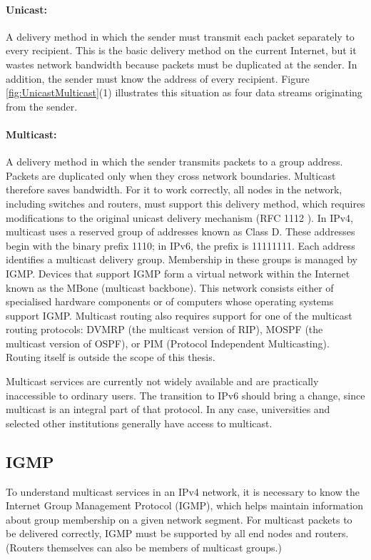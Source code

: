 \paragraph*{Unicast:} A delivery method in which the sender must transmit each packet separately to every recipient. This is the basic delivery method on the current Internet, but it wastes network bandwidth because packets must be duplicated at the sender. In addition, the sender must know the address of every recipient. Figure \ref{fig:UnicastMulticast}(1) illustrates this situation as four data streams originating from the sender.

\paragraph*{Multicast:} A delivery method in which the sender transmits packets to a group address. Packets are duplicated only when they cross network boundaries. Multicast therefore saves bandwidth. For it to work correctly, all nodes in the network, including switches and routers, must support this delivery method, which requires modifications to the original unicast delivery mechanism (RFC 1112 \cite{RFC-1112-HostExtensionsForIPMulticasting}). In IPv4, multicast uses a reserved group of addresses known as Class D. These addresses begin with the binary prefix 1110; in IPv6, the prefix is 11111111. Each address identifies a multicast delivery group. Membership in these groups is managed by IGMP. Devices that support IGMP form a virtual network within the Internet known as the MBone (multicast backbone). This network consists either of specialised hardware components or of computers whose operating systems support IGMP. Multicast routing also requires support for one of the multicast routing protocols: DVMRP (the multicast version of RIP), MOSPF (the multicast version of OSPF), or PIM (Protocol Independent Multicasting). Routing itself is outside the scope of this thesis.

Multicast services are currently not widely available and are practically inaccessible to ordinary users. The transition to IPv6 should bring a change, since multicast is an integral part of that protocol. In any case, universities and selected other institutions generally have access to multicast.

\subsection{IGMP}
To understand multicast services in an IPv4 network, it is necessary to know the Internet Group Management Protocol (IGMP), which helps maintain information about group membership on a given network segment. For multicast packets to be delivered correctly, IGMP must be supported by all end nodes and routers. (Routers themselves can also be members of multicast groups.)

